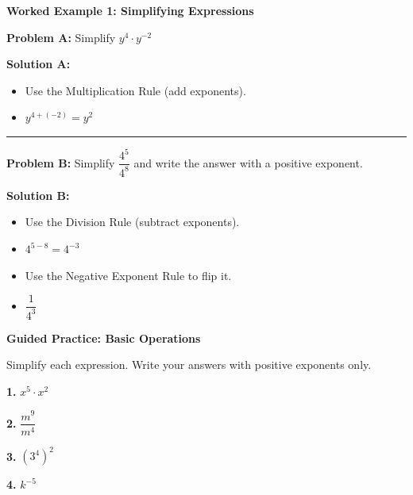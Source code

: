 \documentclass[12pt, letterpaper, fleqn]{article}
\newcommand{\blanklong}{\underline{\hspace{6.5cm}}}
\begin{document}
\vspace{3mm}

\begin{tcolorbox}[colback=white, colframe=black!25, boxrule=0.6pt, arc=4mm, left=6mm, right=6mm, top=5mm, bottom=5mm]

\textbf{Worked Example 1: Simplifying Expressions}

\medskip

\textbf{Problem A:} Simplify $y^4 \cdot y^{-2}$

\medskip

\textbf{Solution A:}
\begin{itemize}
    \item Use the Multiplication Rule (add exponents).
    \item $y^{4 + (-2)} = y^2$
\end{itemize}

\medskip
\hrule
\medskip

\textbf{Problem B:} Simplify $\dfrac{4^5}{4^8}$ and write the answer with a positive exponent.

\medskip

\textbf{Solution B:}
\begin{itemize}
    \item Use the Division Rule (subtract exponents).
    \item $4^{5 - 8} = 4^{-3}$
    \item Use the Negative Exponent Rule to flip it.
    \item $\dfrac{1}{4^3}$
\end{itemize}

\end{tcolorbox}

\vspace{4mm}

\newpage

\begin{tcolorbox}[colback=white!15, colframe=black, boxrule=1.5pt, arc=4mm, left=6mm, right=6mm, top=5mm, bottom=5mm]

\textbf{Guided Practice: Basic Operations}

\medskip

Simplify each expression. Write your answers with positive exponents only.
\vspace{2mm}

\noindent
\textbf{1.} $x^5 \cdot x^2$ \blanklong
\vspace{1.5cm}

\noindent
\textbf{2.} $\dfrac{m^9}{m^4}$ \blanklong
\vspace{1.5cm}

\noindent
\textbf{3.} $(3^4)^2$ \blanklong
\vspace{1.5cm}

\noindent
\textbf{4.} $k^{-5}$ \blanklong
\vspace{1.5cm}

\end{tcolorbox}
\end{document}
